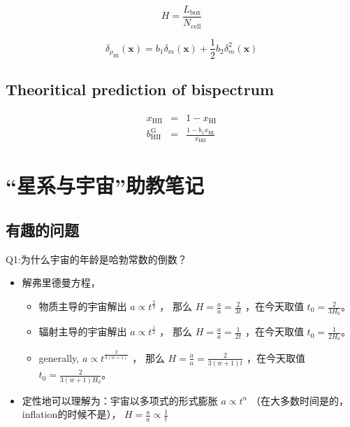 \documentclass[]{ctexart}
\begin{document}
\begin{equation}
    H = \frac{L_\mathrm{box}}{N_\mathrm{cell}}
\end{equation}

\begin{equation*}
    \delta_{\rho_{\mathrm{HI}}}(\boldsymbol{x})=b_{1} \delta_{m}(\boldsymbol{x})+\frac{1}{2} b_{2} \delta_{m}^{2}(\boldsymbol{x})
\end{equation*}



\subsection{Theoritical prediction of bispectrum}

\begin{eqnarray}
    x_\mathrm{HII} &=& 1 - x_\mathrm{HI} \\ 
    b_\mathrm{HII}^\mathrm{G} &=& \frac{1 - b_1 x_\mathrm{HI} }{x_\mathrm{HII}} 
\end{eqnarray}







\section{“星系与宇宙”助教笔记}

\subsection{有趣的问题}

Q1:为什么宇宙的年龄是哈勃常数的倒数？
\begin{itemize}
    \item 解弗里德曼方程，
    \begin{itemize}
        \item 物质主导的宇宙解出 $a \propto t^\frac{2}{3}$ ， 那么 $H=\frac{\dot{a}}{a}=\frac{2}{3t}$ ，在今天取值 $t_0 = \frac{2}{3 H_0}$。
        \item 辐射主导的宇宙解出 $a \propto t^\frac{1}{2}$ ， 那么 $H=\frac{\dot{a}}{a}=\frac{1}{2t}$ ，在今天取值 $t_0 = \frac{1}{2 H_0}$。
        \item generally, $a \propto t^\frac{2}{3(w+1)}$ ， 那么 $H=\frac{\dot{a}}{a}=\frac{2}{3(w+1) t}$ ，在今天取值 $t_0 = \frac{2}{3(w+1) H_0}$。
    \end{itemize}
    \item 定性地可以理解为：宇宙以多项式的形式膨胀 $a \propto t^n$ （在大多数时间是的，inflation的时候不是）， $H=\frac{\dot{a}}{a}\propto \frac{1}{t}$ 
\end{itemize}
\end{document}
